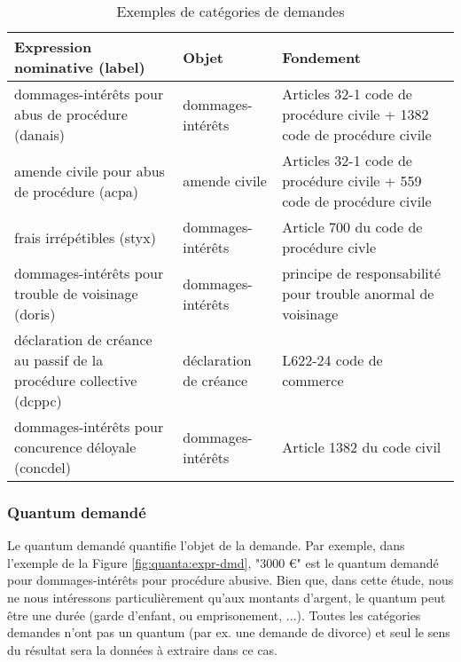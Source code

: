 \begin{table}[h!]
\scriptsize
\begin{tabular}{|p{}|p{}|p{}|}
\hline
\textbf{Expression nominative (label)  }                                     & \textbf{Objet}                                                       & \textbf{Fondement}                                                                 \\ \hline
dommages-intérêts pour abus de procédure (danais)                    & dommages-intérêts                                           & Articles 32-1 code de procédure civile + 1382 code de procédure civile \\ \hline
amende civile pour abus de procédure (acpa)                        & amende civile                                               & Articles 32-1 code de procédure civile + 559 code de procédure civile  \\ \hline
frais irrépétibles  (styx)                                        & dommages-intérêts                                           & Article 700 du code de procédure civle                                 \\ \hline
dommages-intérêts pour trouble de voisinage (doris)                 & dommages-intérêts                                           & principe de responsabilité pour trouble anormal de voisinage           \\ \hline
déclaration de créance au passif de la procédure collective (dcppc) & déclaration de créance & L622-24 code de commerce                                               \\ \hline
dommages-intérêts pour concurence déloyale (concdel)                  & dommages-intérêts                                           & Article 1382 du code civil                                             \\ \hline
\end{tabular}
\caption{Exemples de catégories de demandes}\label{tab:quanta:exemple-categorie}
\end{table}

\subsubsection{Quantum demandé}
Le quantum demandé quantifie l'objet de la demande. Par exemple, dans l'exemple de la Figure \ref{fig:quanta:expr-dmd}, "3000 \euro{}" est le quantum demandé pour dommages-intérêts pour procédure abusive. Bien que, dans cette étude, nous ne nous intéressons particulièrement qu'aux montants d'argent, le quantum peut être une durée (garde d'enfant, ou emprisonement, ...). Toutes les catégories demandes n'ont pas un quantum (par ex. une demande de divorce) et seul le sens du résultat sera la données à extraire dans ce cas.

